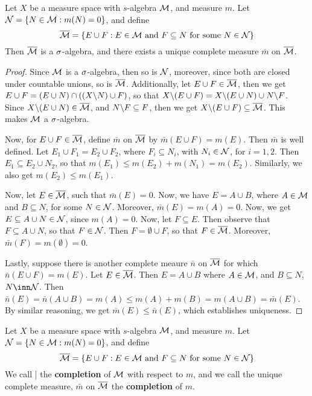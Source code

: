 \begin{theorem}
    Let $X$ be a measure space with $s$-algebra $\mathcal{M}$, and measure $m$. Let
    $\mathcal{N}=\{N \in \mathcal{M} : m(N)=0\}$, and define
    \begin{equation*}
        \overline{\mathcal{M}}=\{E \cup F : E \in \mathcal{M} \text{ and } F \subseteq N \text{ for
        some } N \in \mathcal{N}\}
    \end{equation*}
    Then $\overline{\mathcal{M}}$ is a $\sigma$-algebra, and there exists a unique complete
    measure $\bar{m}$ on $\overline{\mathcal{M}}$.
\end{theorem}
\begin{proof}
    Since $\mathcal{M}$ is a  $\sigma$-algebra, then so is $\mathcal{N}$, moreover, since both are
    closed under countable unions, so is $\overline{\mathcal{M}}$. Additionally, let $E \cup
    F \in \overline{\mathcal{M}}$, then we get $E \cup F=(E \cup N) \cap ((X \backslash N) \cup
    F)$, so that $X \backslash (E \cup F)=X \backslash (E \cup N) \cup N \backslash F$.
    Since $X \backslash (E \cup N) \in \overline{\mathcal{M}}$, and $N \backslash F \subseteq F$,
    then we get $X \backslash (E \cup F) \subseteq \overline{\mathcal{M}}$. This makes $\mathcal{M}$ a
    $\sigma$-algebra.

    Now, for  $E \cup F \in \overline{\mathcal{M}}$, define $\bar{m}$ on $\overline{\mathcal{M}}$ by
    $\bar{m}(E \cup F)=m(E)$. Then $\bar{m}$ is well defined. Let $E_1 \cup
    F_1=E_2 \cup F_2$, where $F_i \subseteq N_i$, with $N_i \in \mathcal{N}$, for
    $i=1,2$. Then  $E_1 \subseteq E_2 \cup N_2$, so that $m(E_1) \leq
    m(E_2)+m(N_1)=m(E_2)$. Similarly, we also get $m(E_2) \leq m(E_1)$.

    Now, let $E \in \overline{\mathcal{M}}$, such that $\bar{m}(E)=0$. Now, we have $E=A \cup
    B$, where  $A \in \mathcal{M}$ and $B \subseteq N$, for some $N \in \mathcal{N}$. Moreover,
    $\bar{m}(E)=m(A)=0$. Now, we get $E \subseteq A \cup N \in \mathcal{N}$, since
    $m(A)=0$. Now, let $F \subseteq E$. Then observe that $F \subseteq A \cup
    N$, so that $F \in \mathcal{N}$. Then $F=\emptyset \cup F$, so that  $F \in
    \overline{\mathcal{M}}$. Moreover, $\bar{m}(F)=m(\emptyset)=0$.

    Lastly, suppose there is another complete meaure $\bar{n}$ on $\overline{\mathcal{M}}$
    for which $\bar{n}(E \cup F)=m(E)$. Let $E \in \overline{\mathcal{M}}$. Then $E=A \cup B$
    where  $A \in \mathcal{M}$, and $B \subseteq N$, $N \inn \Nc$. Then
    $\bar{n}(E)=\bar{n}(A \cup B)=m(A) \leq m(A)+m(B)=m(A \cup B)=\bar{m}(E)$.
    By similar reasoning, we get $\bar{m}(E) \leq \bar{n}(E)$, which establishes
    uniqueness.
\end{proof}

\begin{definition}
    Let $X$ be a measure space with $s$-algebra $\mathcal{M}$, and measure $m$. Let
    $\mathcal{N}=\{N \in \mathcal{M} : m(N)=0\}$, and define
    \begin{equation*}
        \overline{\mathcal{M}}=\{E \cup F : E \in \mathcal{M} \text{ and } F \subseteq N \text{ for
        some } N \in \mathcal{N}\}
    \end{equation*}
    We call \bar{\Mc} the \textbf{completion} of $\mathcal{M}$ with respect to $m$, and
    we call the unique complete measure, $\bar{m}$ on $\overline{\mathcal{M}}$ the
    \textbf{completion} of $m$.
\end{definition}
